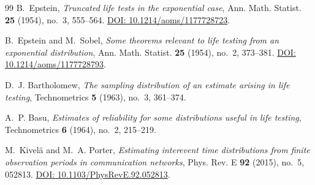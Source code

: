\documentclass[11pt,a4paper]{article}
\theoremstyle{plain}
\theoremstyle{remark}
\begin{document}
\begin{thebibliography}{99}
 B.~Epstein, \emph{Truncated life tests in the
exponential case}, Ann. Math. Statist. \textbf{25} (1954), no.~3, 555--564.
\href{https://doi.org/10.1214/aoms/1177728723}{DOI: 10.1214/aoms/1177728723}.

 B.~Epstein and M.~Sobel, \emph{Some theorems
relevant to life testing from an exponential distribution}, Ann. Math. Statist.
\textbf{25} (1954), no.~2, 373--381.
\href{https://doi.org/10.1214/aoms/1177728793}{DOI: 10.1214/aoms/1177728793}.

 D.~J. Bartholomew, \emph{The sampling distribution of
an estimate arising in life testing}, Technometrics \textbf{5} (1963), no.~3,
361--374.

 A.~P. Basu, \emph{Estimates of reliability for some
distributions useful in life testing}, Technometrics \textbf{6} (1964), no.~2,
215--219.

 M.~Kivel\"{a} and M.~A. Porter, \emph{Estimating interevent
time distributions from finite observation periods in communication networks},
Phys. Rev. E \textbf{92} (2015), no.~5, 052813.
\href{https://doi.org/10.1103/PhysRevE.92.052813}{DOI:
10.1103/PhysRevE.92.052813}.

\end{thebibliography}
\end{document}
